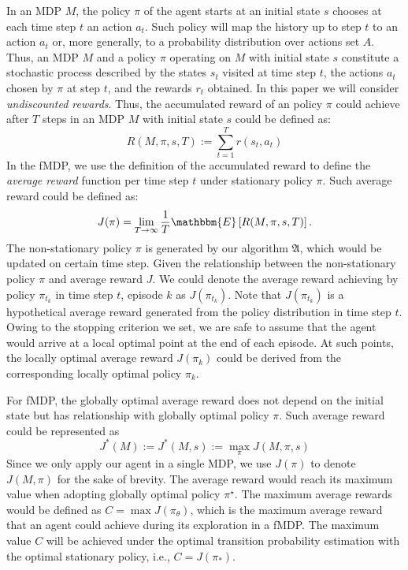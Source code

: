 \documentclass{article}
\theoremstyle{plain}
\theoremstyle{definition}
\theoremstyle{remark}
\begin{document}
In an MDP $M$, the policy $\pi$ of the agent starts at an initial state $s$ chooses at each time step $t$ an action $a_{t}$. Such policy will map the history up to step $t$ to an action $a_{t}$ or, more generally, to a probability distribution over actions set $A$. Thus, an MDP $M$ and a policy $\pi$ operating on $M$ with initial state $s$ constitute a stochastic process described by the states $s_{t}$ visited at time step $t$, the actions $a_{t}$ chosen by $\pi$ at step $t$, and the rewards $r_{t}$ obtained. In this paper we will consider \emph{undiscounted rewards}. Thus, the accumulated reward of an policy $\pi$ could achieve after $T$ steps in an MDP $M$ with initial state $s$ could be defined as:
\begin{equation}
R(M, \pi, s, T):=\sum_{t=1}^T r(s_t,a_t)
\end{equation}
In the fMDP, we use the definition of the accumulated reward to define the \emph{average reward} function per time step $t$ under stationary policy $\pi$. Such average reward could be defined as:
\begin{equation}
\label{equation1}
J(\pi)=\lim_{T \rightarrow \infty} \frac{1}{T} \mathbbm{E}\left[R(M, \pi, s, T)\right].
\end{equation}
The non-stationary policy $\pi$ is generated by our algorithm $\mathfrak{A}$, which would be updated on certain time step. Given the relationship between the non-stationary policy $\pi$ and average reward $J$. We could denote the average reward achieving by policy $\pi_{t_{k}}$ in time step $t$, episode $k$ as $J(\pi_{t_{k}})$. Note that $J(\pi_{t_{k}})$ is a hypothetical average reward generated from the policy distribution in time step $t$. Owing to the stopping criterion we set, we are safe to assume that the agent would arrive at a local optimal point at the end of each episode. At such points, the locally optimal average reward $J(\pi_{k})$ could be derived from the corresponding locally optimal policy $\pi_{k}$.


For fMDP, the globally optimal average reward does not depend on the initial state but has relationship with globally optimal policy $\pi$. Such average reward could be represented as
\begin{equation}
J^*(M):=J^*(M,s):=\max _\pi J(M, \pi, s)
\end{equation}
Since we only apply our agent in a single MDP, we use $J(\pi)$ to denote $J(M,\pi)$ for the sake of brevity. The average reward would reach its maximum value when adopting globally optimal policy $\pi^{\star}$. The maximum average rewards would be defined as $C=\max J(\pi_{\theta})$, which is the maximum average reward that an agent could achieve during its exploration in a fMDP. The maximum value $C$ will be achieved under the optimal transition probability estimation with the optimal stationary policy, i.e., $C=J(\pi_{*})$.
\end{document}
